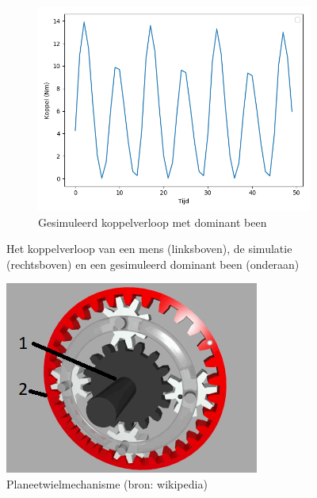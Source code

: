 \begin{figure}[t!]
\begin{subfigure}{.5\textwidth}
  \includegraphics[width=\linewidth]{images/gesimuleerdekoppeldominantbeen.png}
  \caption{Gesimuleerd koppelverloop met dominant been}
  \label{fig:gesimuleerde koppel dominant been}
\end{subfigure}
\caption{Het koppelverloop van een mens (linksboven), de simulatie (rechtsboven) en een gesimuleerd dominant been (onderaan)}
\label{fig:koppelverloop mens-simulatie}
\end{figure}
\newpage
\begin{figure}
  \centering
  \includegraphics[width=\linewidth]{images/planeetwielmechanisme.png}
  \caption{Planeetwielmechanisme (bron: wikipedia)}
  \label{fig:planeetwielmechanisme}
\end{figure}

